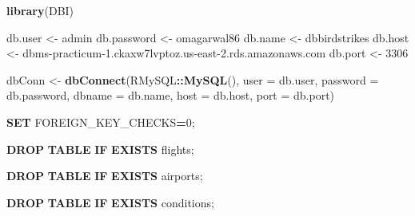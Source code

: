 \documentclass[
]{article}
\newenvironment{Shaded}{\begin{snugshade}}{\end{snugshade}}
\newcommand{\AttributeTok}[1]{\textcolor[rgb]{0.13,0.29,0.53}{#1}}
\newcommand{\ControlFlowTok}[1]{\textcolor[rgb]{0.13,0.29,0.53}{\textbf{#1}}}
\newcommand{\DecValTok}[1]{\textcolor[rgb]{0.00,0.00,0.81}{#1}}
\newcommand{\FunctionTok}[1]{\textcolor[rgb]{0.13,0.29,0.53}{\textbf{#1}}}
\newcommand{\KeywordTok}[1]{\textcolor[rgb]{0.13,0.29,0.53}{\textbf{#1}}}
\newcommand{\NormalTok}[1]{#1}
\newcommand{\OperatorTok}[1]{\textcolor[rgb]{0.81,0.36,0.00}{\textbf{#1}}}
\newcommand{\OtherTok}[1]{\textcolor[rgb]{0.56,0.35,0.01}{#1}}
\newcommand{\SpecialCharTok}[1]{\textcolor[rgb]{0.81,0.36,0.00}{\textbf{#1}}}
\newcommand{\StringTok}[1]{\textcolor[rgb]{0.31,0.60,0.02}{#1}}
\begin{document}
\begin{Shaded}
\begin{Highlighting}[]
\FunctionTok{library}\NormalTok{(DBI)}

\NormalTok{db.user }\OtherTok{\textless{}{-}} \StringTok{\textquotesingle{}admin\textquotesingle{}}      
\NormalTok{db.password }\OtherTok{\textless{}{-}} \StringTok{\textquotesingle{}omagarwal86\textquotesingle{}}
\NormalTok{db.name }\OtherTok{\textless{}{-}} \StringTok{\textquotesingle{}dbbirdstrikes\textquotesingle{}}
\NormalTok{db.host }\OtherTok{\textless{}{-}} \StringTok{\textquotesingle{}dbms{-}practicum{-}1.ckaxw7lvptoz.us{-}east{-}2.rds.amazonaws.com\textquotesingle{}}
\NormalTok{db.port }\OtherTok{\textless{}{-}} \DecValTok{3306}

\NormalTok{dbConn }\OtherTok{\textless{}{-}}  \FunctionTok{dbConnect}\NormalTok{(RMySQL}\SpecialCharTok{::}\FunctionTok{MySQL}\NormalTok{(), }\AttributeTok{user =}\NormalTok{ db.user, }\AttributeTok{password =}\NormalTok{ db.password,}
                           \AttributeTok{dbname =}\NormalTok{ db.name, }\AttributeTok{host =}\NormalTok{ db.host, }\AttributeTok{port =}\NormalTok{ db.port)}
\end{Highlighting}
\end{Shaded}

\begin{Shaded}
\begin{Highlighting}[]
\KeywordTok{SET}\NormalTok{ FOREIGN\_KEY\_CHECKS}\OperatorTok{=}\DecValTok{0}\NormalTok{;}
\end{Highlighting}
\end{Shaded}

\begin{Shaded}
\begin{Highlighting}[]
\KeywordTok{DROP} \KeywordTok{TABLE} \ControlFlowTok{IF} \KeywordTok{EXISTS}\NormalTok{ flights;}
\end{Highlighting}
\end{Shaded}

\begin{Shaded}
\begin{Highlighting}[]
\KeywordTok{DROP} \KeywordTok{TABLE} \ControlFlowTok{IF} \KeywordTok{EXISTS}\NormalTok{ airports;}
\end{Highlighting}
\end{Shaded}

\begin{Shaded}
\begin{Highlighting}[]
\KeywordTok{DROP} \KeywordTok{TABLE} \ControlFlowTok{IF} \KeywordTok{EXISTS}\NormalTok{ conditions;}
\end{Highlighting}
\end{Shaded}
\end{document}
